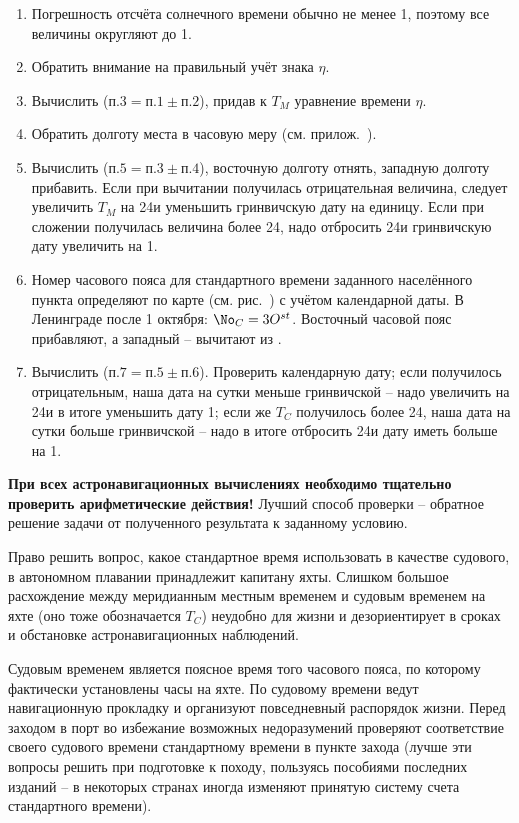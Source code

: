 \begin{small}
  \begin{enumerate} 
  \item Погрешность отсчёта солнечного времени обычно не менее 1\tmin,
    поэтому все величины округляют до 1\tmin.
  \item Обратить внимание на правильный учёт знака $\eta$.
  \item Вычислить ($\text{п.}3 = \text{п.}1 \pm \text{п.}2$), придав к
    $T_M$ уравнение времени $\eta$.
  \item Обратить долготу места в часовую меру
    (см. прилож.~).
  \item Вычислить ($\text{п.}5 = \text{п.}3 \pm \text{п.}4$),
    восточную долготу отнять, западную долготу прибавить. Если при
    вычитании получилась отрицательная величина, следует увеличить
    $T_M$ на 24\thr и уменьшить гринвичскую дату на единицу. Если при
    сложении получилась величина более 24\thr, надо отбросить 24\thr и
    гринвичскую дату увеличить на 1\tday.
  \item Номер часового пояса для стандартного времени заданного
    населённого пункта определяют по карте (см. рис.~) с
    учётом календарной даты. В Ленинграде после 1 октября:
    $\mathNo_C = 3 \Ost$. Восточный часовой пояс прибавляют, а
    западный \--- вычитают из \Tgr.
  \item Вычислить ($\text{п.}7 = \text{п.}5 \pm
    \text{п.}6$). Проверить календарную дату; если 
    получилось отрицательным, наша дата на сутки меньше гринвичской
    \--- надо увеличить \Tgr на 24\thr и в итоге уменьшить дату
    1\tday; если же $T_C$ получилось более 24\thr, наша дата на сутки
    больше гринвичской \--- надо в итоге отбросить 24\thr и дату иметь
    больше на 1\tday.
  \end{enumerate}
\end{small}
  
\textbf{При всех астронавигационных вычислениях необходимо тщательно
  проверить арифметические действия!}  Лучший способ проверки \---
обратное решение задачи от полученного результата к заданному условию.

Право решить вопрос, какое стандартное время использовать в качестве судового, в автономном плавании принадлежит капитану яхты. Слишком большое расхождение между меридианным местным временем и судовым временем на яхте (оно тоже обозначается $T_C$) неудобно для жизни и дезориентирует в сроках и обстановке астронавигационных наблюдений.

Судовым временем является поясное время того часового пояса, по которому фактически установлены часы на яхте. По судовому времени ведут навигационную прокладку и организуют повседневный распорядок жизни. Перед заходом в порт во избежание возможных недоразумений проверяют соответствие своего судового времени стандартному времени в пункте захода (лучше эти вопросы решить при подготовке к походу, пользуясь пособиями последних изданий \--- в некоторых странах иногда изменяют принятую систему счета стандартного времени).

